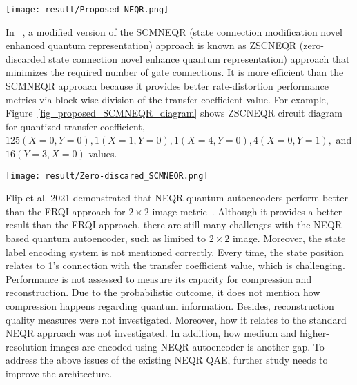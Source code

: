 \begin{figure*}[htbp]
\centerline{\texttt{[image: result/Proposed\_NEQR.png]}}
\caption{A NZ-NEQR circuit for pixel values representation where an initial connection (marked as red) and zero-discarded zone (marked as orange). Zero is discarded because the identity gate has no control over the c-not gate.}
\label{fig_nzneqr_diagram}
\end{figure*}
In ~\cite{haque2023efficient}, a modified version of the SCMNEQR (state connection modification novel enhanced quantum representation) approach  \cite{haqueblock} is known as ZSCNEQR (zero-discarded state connection novel enhance quantum representation) approach that minimizes the required number of gate connections. It is more efficient than the SCMNEQR approach because it provides better rate-distortion performance metrics via block-wise division of the transfer coefficient value. For example, Figure~\ref{fig_proposed_SCMNEQR_diagram} shows ZSCNEQR circuit diagram for quantized transfer coefficient,  $125(X=0, Y=0), 1(X=1, Y=0), 1(X=4, Y=0), 4(X=0, Y=1),$ and $16(Y=3, X=0)$ values.

\begin{figure*}[!t]
\centerline{\texttt{[image: result/Zero-discared\_SCMNEQR.png]}}
\caption{Quantized transform coefficient representation based on ZSCNEQR circuit. It includes an initial connection (marked in red) and a zero-discarded zone (marked in green)}
\label{fig_proposed_SCMNEQR_diagram}
\end{figure*}

Flip et al. 2021 demonstrated that NEQR quantum autoencoders perform better than the FRQI approach for $2\times2$ image metric~\cite{thesis}. Although it provides a better result than the FRQI approach, there are still many challenges with the NEQR-based quantum autoencoder, such as limited to $2\times2$ image. Moreover, the state label encoding system is not mentioned correctly. Every time, the state position relates to 1's connection with the transfer coefficient value, which is challenging. Performance is not assessed to measure its capacity for compression and reconstruction. Due to the probabilistic outcome, it does not mention how compression happens regarding quantum information. Besides, reconstruction quality measures were not investigated. Moreover, how it relates to the standard NEQR approach was not investigated. In addition, how medium and higher-resolution images are encoded using NEQR autoencoder is another gap. To address the above issues of the existing NEQR QAE, further study needs to improve the architecture.